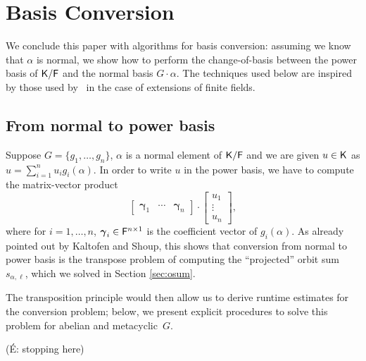 \section{Basis Conversion}\label{sec:conversion}

We conclude this paper with algorithms for basis conversion: assuming
we know that $\alpha$ is normal, we show how to perform the
change-of-basis between the power basis of ${\mathsf{K}}/{\mathsf{F}}$ and the normal
basis $G\cdot \alpha$. The techniques used below are inspired by 
those used by~\cite[Section~4]{KalSho98} in the case of extensions
of finite fields.

\subsection{From normal to power basis} Suppose $G = \lbrace g_1, \ldots, g_n
\rbrace$, $\alpha$ is a normal element of ${\mathsf{K}}/{\mathsf{F}}$ and we are given $u\in {\mathsf{K}}$ 
as $u=\sum_{i=1}^n u_i g_i(\alpha)$. In order to write
$u $ in the power basis, we have to compute the matrix-vector 
product
\begin{equation}\label{eq:norm2pwrmat}
\left[\begin{array}{ccc}
\boldsymbol \gamma_1 & \cdots & \boldsymbol \gamma_n 
\end{array}\right]\cdot 
\begin{bmatrix}
u_1 \\ \vdots \\ u_n
\end{bmatrix},
\end{equation}
where for $i=1,\dots,n$, $\boldsymbol \gamma_i \in {\mathsf{F}}^{n\times 1}$ is
the coefficient vector of $g_i(\alpha)$. As already pointed out by
Kaltofen and Shoup, this shows that conversion from normal to power
basis is the transpose problem of computing the ``projected'' orbit
sum $s_{\alpha,\ell}$, which we solved in Section \ref{sec:osum}. 

The transposition principle would then allow us to derive runtime
estimates for the conversion problem; below, we present explicit
procedures to solve this problem for abelian and metacyclic~$G$.

(\'E: stopping here)

